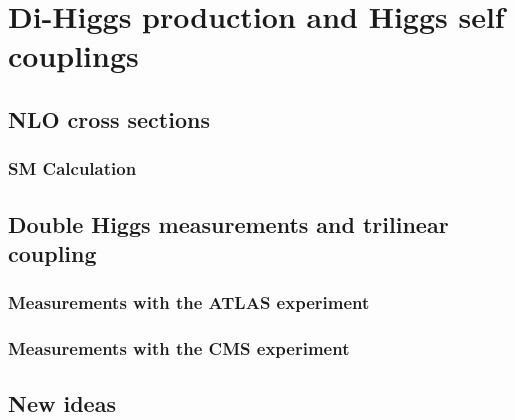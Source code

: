 \documentclass[../report.tex]{subfiles}
\providecommand{\main}{..}
\begin{document}
\section{Di-Higgs production and Higgs self couplings}

\subsection{NLO cross sections}

\subsubsection{SM Calculation}










\subsection{Double Higgs measurements and trilinear coupling}

\subsubsection{Measurements with the ATLAS experiment}
\label{sec:HH_ATLAS}



\subsubsection{Measurements with the CMS experiment}



\subsection{New ideas}

\end{document}
